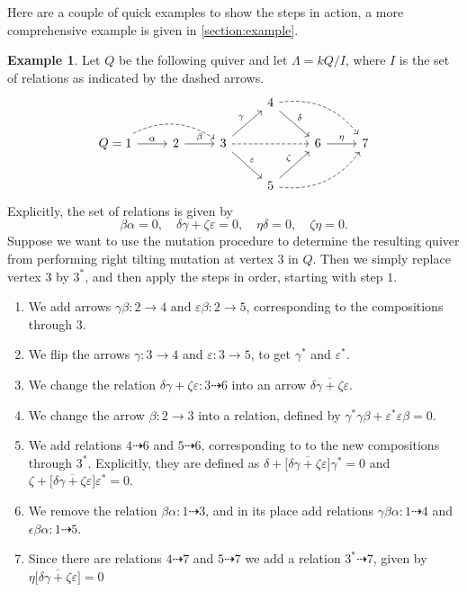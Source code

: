 \documentclass[12pt, dvipsnames, oneside]{amsart}
\theoremstyle{definition}
\newtheorem{example}{Example}[section]
\begin{document}
\restoregeometry

\bigskip

Here are a couple of quick examples to show the steps in action, a more comprehensive example is given in \cref{section:example}. 
\begin{example}
Let $Q$ be the following quiver and let $\Lambda=kQ/I$, where $I$ is the set of relations as indicated by the dashed arrows. \begin{equation*}
\begin{tikzcd}
 & & & 4 \arrow[dr, "\delta"] \arrow[drr, dashed, bend left] & & \\
 Q = 1 \arrow[r, "\alpha"] \arrow[rr, bend left, dashed] & 2 \arrow[r, "\beta"] & 3 \arrow[ur, "\gamma"] \arrow[dr, "\varepsilon"] \arrow[rr, dashed] & & 6 \arrow[r, "\eta"] & 7 \\
 & & & 5 \arrow[ur, "\zeta"] \arrow[urr, dashed, bend right] & & 
\end{tikzcd}
\end{equation*}
Explicitly, the set of relations is given by
$$\beta\alpha=0,\quad \delta\gamma+\zeta\varepsilon = 0,\quad \eta\delta = 0,\quad \zeta\eta = 0.$$
Suppose we want to use the mutation procedure to determine the resulting quiver from performing right tilting mutation at vertex $3$ in $Q$. Then we simply replace vertex $3$ by $3^*$, and then apply the steps in order, starting with step $1$.
\begin{enumerate}
\item We add arrows $\gamma\beta\colon 2\rightarrow 4$ and $\varepsilon\beta\colon 2\rightarrow 5$, corresponding to the compositions through $3$.
\item We flip the arrows $\gamma\colon 3\rightarrow 4$ and $\varepsilon\colon 3\rightarrow 5$, to get $\gamma^*$ and $\varepsilon^*$.
\item We change the relation $\delta\gamma+\zeta\varepsilon\colon3\dashrightarrow 6$ into an arrow $\overline{\delta\gamma+\zeta\varepsilon}$.
\item We change the arrow $\beta\colon 2\rightarrow 3$ into a relation, defined by $\gamma^*\gamma\beta+\varepsilon^*\varepsilon\beta=0$.
\item We add relations $4\dashrightarrow 6$ and $5\dashrightarrow 6$, corresponding to to the new compositions through $3^*$. Explicitly, they are defined as $\delta+\Big[\overline{\delta\gamma+\zeta\varepsilon}\Big]\gamma^* = 0$ and $\zeta + \Big[\overline{\delta\gamma+\zeta\varepsilon}\Big]\varepsilon^*=0$.
\item We remove the relation $\beta\alpha\colon1\dashrightarrow 3$, and in its place add relations $\gamma\beta\alpha\colon 1\dashrightarrow 4$ and $\epsilon\beta\alpha\colon 1\dashrightarrow 5$.
\item Since there are relations $4\dashrightarrow 7$ and $5\dashrightarrow 7$ we add a relation $3^*\dashrightarrow 7$, given by $\eta\Big[\overline{\delta\gamma+\zeta\varepsilon}\Big]=0$
\end{enumerate} 


\end{example}
\end{document}
